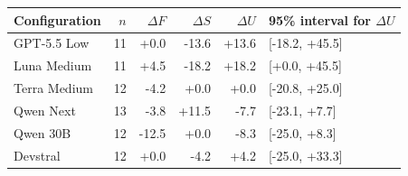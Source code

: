 \begin{tabular}{lrrrrl}
\toprule
Configuration & $n$ & $\Delta F$ & $\Delta S$ & $\Delta U$ & 95\% interval for $\Delta U$\\
\midrule
GPT-5.5 Low & 11 & +0.0 & -13.6 & +13.6 & [-18.2, +45.5]\\
Luna Medium & 11 & +4.5 & -18.2 & +18.2 & [+0.0, +45.5]\\
Terra Medium & 12 & -4.2 & +0.0 & +0.0 & [-20.8, +25.0]\\
Qwen Next & 13 & -3.8 & +11.5 & -7.7 & [-23.1, +7.7]\\
Qwen 30B & 12 & -12.5 & +0.0 & -8.3 & [-25.0, +8.3]\\
Devstral & 12 & +0.0 & -4.2 & +4.2 & [-25.0, +33.3]\\
\bottomrule
\end{tabular}
